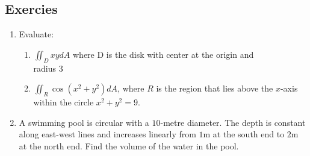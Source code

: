 \documentclass[12pt]{article}
\begin{document}
\subsection{Exercies}
\begin{enumerate}
	\item Evaluate:
		\begin{enumerate}
			\item \(\iint_{D}xydA\) where D is the disk with center at the origin and \\ radius \(3\)
			\item \(\iint_{R}\cos(x^2 + y^2)dA\), where \(R\) is the region that lies above the \(x\)-axis within the circle \(x^2 + y^2 = 9\).
		\end{enumerate}
	\item A swimming pool is circular with a \(10\)-metre diameter. The depth is constant along east-west lines and increases linearly from \(1\)m at the south end to \(2\)m at the north end. Find the volume of the water in the pool.
\end{enumerate}
\end{document}
